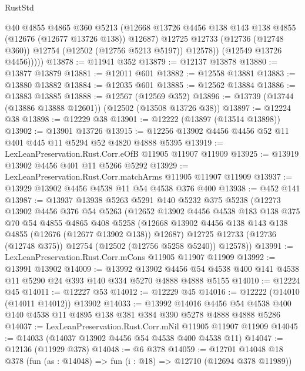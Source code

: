 \begin{lexlean}{RustStd}
\begin{coremodule}
                @40
                @4855
                @4865
                @360
                @5213
                (@12668 @13726 @4456 @138 @143 @138 @4855 (@12676 (@12677 @13726 @138)) @12687)
                @12725
                @12733
                (@12736 (@12748 @360))
                @12754
                (@12502 (@12756 @5213 @5197))
                @12578))
            (@12549 @13726 @4456)))))
@13878 := @11941 @352
@13879 := @12137 @13878
@13880 := @13877 @13879
@13881 := @12011 @601
@13882 := @12558 @13881
@13883 := @13880 @13882
@13884 := @12035 @601
@13885 := @12562 @13884
@13886 := @13883 @13885
@13888 := @12567 (@12569 @352)
@13896 := @13739 (@13744 (@13886 @13888 @12601)) (@12502 (@13508 @13726 @38))
@13897 := @12224 @38
@13898 := @12229 @38
@13901 := @12222 (@13897 (@13514 @13898))
@13902 := @13901 @13726
@13915 := @12256 @13902 @4456 @4456 @52 @11 @401 @445 @11 @5294 @52 @4820 @4888 @5395
@13919 := LexLeanPreservation.Rust.Corr.eOfB @11905 @11907 @11909
@13925 := @13919 @13902 @4456 @401 @11 @5266 @5292
@13929 := LexLeanPreservation.Rust.Corr.matchArms @11905 @11907 @11909
@13937 := @13929 @13902 @4456 @4538 @11 @54 @4538 @376 @400
@13938 := @452 @141
@13987 := @13937
    @13938
    @5263
    @5291
    @140
    @5232
    @375
    @5238
    (@12273
      @13902
      @4456
      @376
      @54
      @5263
      (@12652
        @13902
        @4456
        @4538
        @183
        @138
        @375
        @70
        @54
        @4855
        @4865
        @408
        @5258
        (@12668 @13902 @4456 @138 @143 @138 @4855 (@12676 (@12677 @13902 @138)) @12687)
        @12725
        @12733
        (@12736 (@12748 @375))
        @12754
        (@12502 (@12756 @5258 @5240))
        @12578))
@13991 := LexLeanPreservation.Rust.Corr.mCons @11905 @11907 @11909
@13992 := @13991 @13902
@14009 := @13992
    @13902
    @4456
    @54
    @4538
    @400
    @141
    @4538
    @11
    @5290
    @24
    @393
    @140
    @334
    @5270
    @4888
    @4888
    @5155
@14010 := @12224 @45
@14011 := @12227 @53
@14012 := @12229 @45
@14016 := @12222 (@14010 (@14011 @14012)) @13902
@14033 := @13992
    @14016
    @4456
    @54
    @4538
    @400
    @140
    @4538
    @11
    @4895
    @138
    @381
    @384
    @390
    @5278
    @4888
    @4888
    @5286
@14037 := LexLeanPreservation.Rust.Corr.mNil @11905 @11907 @11909
@14045 := @14033 (@14037 @13902 @4456 @54 @4538 @400 @4538 @11)
@14047 := @12136 (@11929 @378)
@14048 := @6 @378
@14059 := @12701
    @14048
    @18
    @378
    (fun (as : @14048) => fun (i : @18) => @12710 (@12694 @378 @11989))

\end{coremodule}
\end{lexlean}
